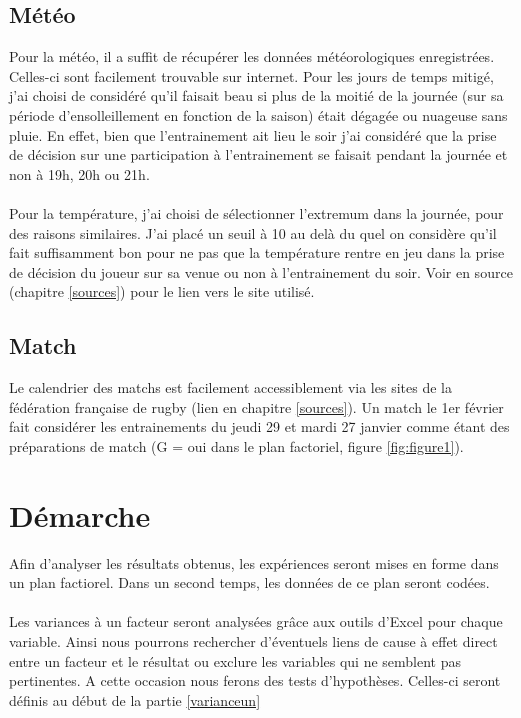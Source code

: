 \documentclass[12pt, a4paper,french]{report}
\begin{document}
    \subsection{Météo}
      Pour la météo, il a suffit de récupérer les données météorologiques enregistrées. Celles-ci sont facilement trouvable sur internet. Pour les jours de temps mitigé, j'ai choisi de considéré qu'il faisait beau si plus de la moitié de la journée (sur sa période d'ensolleillement en fonction de la saison) était dégagée ou nuageuse sans pluie. En effet, bien que l'entrainement ait lieu le soir j'ai considéré que la prise de décision sur une participation à l'entrainement se faisait pendant la journée et non à 19h, 20h ou 21h.
      \paragraph{}Pour la température, j'ai choisi de sélectionner l'extremum dans la journée, pour des raisons similaires. J'ai placé un seuil à 10 au delà du quel on considère qu'il fait suffisamment bon pour ne pas que la température rentre en jeu dans la prise de décision du joueur sur sa venue ou non à l'entrainement du soir. Voir en source (chapitre \ref{sources}) pour le lien vers le site utilisé.
    \subsection{Match}
      Le calendrier des matchs est facilement accessiblement via les sites de la fédération française de rugby (lien en chapitre \ref{sources}). Un match le 1er février fait considérer les entrainements du jeudi 29 et mardi 27 janvier comme étant des préparations de match (G = oui dans le plan factoriel, figure \ref{fig:figure1}).
  \section{Démarche}\label{demarche}
    Afin d'analyser les résultats obtenus, les expériences seront mises en forme dans un plan factiorel. Dans un second temps, les données de ce plan seront codées.\paragraph{}Les variances à un facteur seront analysées grâce aux outils d'Excel pour chaque variable. Ainsi nous pourrons rechercher d'éventuels liens de cause à effet direct entre un facteur et le résultat ou exclure les variables qui ne semblent pas pertinentes. A cette occasion nous ferons des tests d'hypothèses. Celles-ci seront définis au début de la partie \ref{varianceun}
\end{document}
